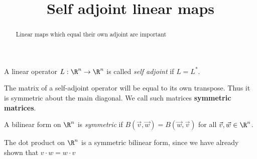 \documentclass{ximera}
\title{Self adjoint linear maps}
\begin{document}
	\begin{abstract}
		Linear maps which equal their own adjoint are important
	\end{abstract}
	
	\begin{definition}
			A linear operator $L:\R^n \to \R^n$ is called \textit{self adjoint} if $L = L^*$.
		\end{definition}
		
		\begin{definition}
			The matrix of a self-adjoint operator will be equal to its own transpose.  Thus it is symmetric about the main diagonal.  We call such matrices \textbf{symmetric matrices}.
		\end{definition}

\begin{definition}
	A bilinear form on $\R^n$ is \textit{symmetric} if $B(\vec{v},\vec{w}) = B(\vec{w},\vec{v})$ for all $\vec{v},\vec{w} \in \R^n$.
\end{definition}

\begin{example}
	The dot product on $\R^n$ is a symmetric bilinear form, since we have already shown that $v \cdot w = w \cdot v$
\end{example}
\end{document}
